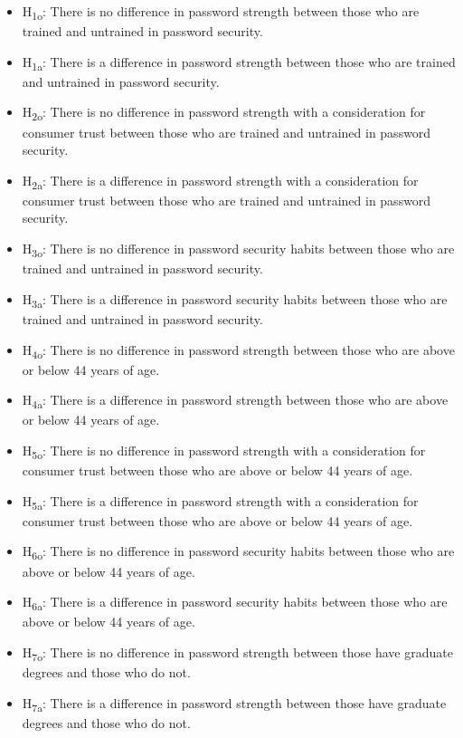 \documentclass[letterpaper, 10 pt, conference]{ieeeconf}  %
\begin{document}
\begin{itemize}
\item H\textsubscript{1o}: There is no difference in password strength between those who are trained and untrained in password security.
\item H\textsubscript{1a}: There is a difference in password strength between those who are trained and untrained in password security.
\item H\textsubscript{2o}: There is no difference in password strength with a consideration for consumer trust between those who are trained and untrained in password security.
\item H\textsubscript{2a}: There is a difference in password strength with a consideration for consumer trust between those who are trained and untrained in password security.
\item H\textsubscript{3o}: There is no difference in password security habits between those who are trained and untrained in password security.
\item H\textsubscript{3a}: There is a difference in password security habits between those who are trained and untrained in password security.
\item H\textsubscript{4o}: There is no difference in password strength between those who are above or below 44 years of age.
\item H\textsubscript{4a}: There is a difference in password strength between those who are above or below 44 years of age.
\item H\textsubscript{5o}: There is no difference in password strength with a consideration for consumer trust between those who are above or below 44 years of age.
\item H\textsubscript{5a}: There is a difference in password strength with a consideration for consumer trust between those who are above or below 44 years of age.
\item H\textsubscript{6o}: There is no difference in password security habits between those who are above or below 44 years of age.
\item H\textsubscript{6a}: There is a difference in password security habits between those who are above or below 44 years of age. 
\item H\textsubscript{7o}: There is no difference in password strength between those have graduate degrees and those who do not.
\item H\textsubscript{7a}: There is a difference in password strength between those have graduate degrees and those who do not.

\end{itemize}
\end{document}
